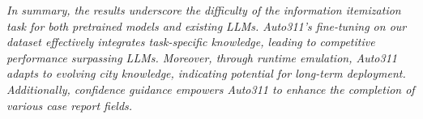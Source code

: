 \textit{In summary, the results underscore the difficulty of the information itemization task for both pretrained models and existing LLMs. Auto311's fine-tuning on our dataset effectively integrates task-specific knowledge, leading to competitive performance surpassing LLMs. Moreover, through runtime emulation, Auto311 adapts to evolving city knowledge, indicating potential for long-term deployment. Additionally, confidence guidance empowers Auto311 to enhance the completion of various case report fields.}




